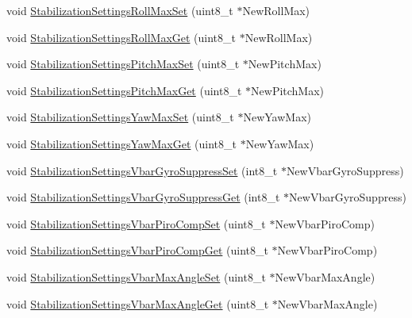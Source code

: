 \begin{DoxyCompactItemize}
void \hyperlink{group___stabilization_settings_ga93e7288b129a89ca448a48def3bf3e86}{\-Stabilization\-Settings\-Roll\-Max\-Set} (uint8\-\_\-t $\ast$\-New\-Roll\-Max)
\item 
void \hyperlink{group___stabilization_settings_ga2e25ad4927cb3f2a3e9641c54637e4f8}{\-Stabilization\-Settings\-Roll\-Max\-Get} (uint8\-\_\-t $\ast$\-New\-Roll\-Max)
\item 
void \hyperlink{group___stabilization_settings_ga8b9a76ba26621b535fa8050a8eb7d5bb}{\-Stabilization\-Settings\-Pitch\-Max\-Set} (uint8\-\_\-t $\ast$\-New\-Pitch\-Max)
\item 
void \hyperlink{group___stabilization_settings_ga0e2eb48efa28b72be85a32f6d9b1ed34}{\-Stabilization\-Settings\-Pitch\-Max\-Get} (uint8\-\_\-t $\ast$\-New\-Pitch\-Max)
\item 
void \hyperlink{group___stabilization_settings_ga6b25867e469a5776d0326baa4bc5e8c1}{\-Stabilization\-Settings\-Yaw\-Max\-Set} (uint8\-\_\-t $\ast$\-New\-Yaw\-Max)
\item 
void \hyperlink{group___stabilization_settings_gaa01ab08e37b9b9279e21a30050d5d14d}{\-Stabilization\-Settings\-Yaw\-Max\-Get} (uint8\-\_\-t $\ast$\-New\-Yaw\-Max)
\item 
void \hyperlink{group___stabilization_settings_gae984784d7f00fbed72d6575997501cad}{\-Stabilization\-Settings\-Vbar\-Gyro\-Suppress\-Set} (int8\-\_\-t $\ast$\-New\-Vbar\-Gyro\-Suppress)
\item 
void \hyperlink{group___stabilization_settings_gaad92f72a8a88d22bc37869099fd66e2f}{\-Stabilization\-Settings\-Vbar\-Gyro\-Suppress\-Get} (int8\-\_\-t $\ast$\-New\-Vbar\-Gyro\-Suppress)
\item 
void \hyperlink{group___stabilization_settings_gaf9c81d059672915abb8f80e9037e67e8}{\-Stabilization\-Settings\-Vbar\-Piro\-Comp\-Set} (uint8\-\_\-t $\ast$\-New\-Vbar\-Piro\-Comp)
\item 
void \hyperlink{group___stabilization_settings_gaafe1c6259a13878928ef70f0d2624d17}{\-Stabilization\-Settings\-Vbar\-Piro\-Comp\-Get} (uint8\-\_\-t $\ast$\-New\-Vbar\-Piro\-Comp)
\item 
void \hyperlink{group___stabilization_settings_gad32a4af319e73d264e489ea2fc8be2c6}{\-Stabilization\-Settings\-Vbar\-Max\-Angle\-Set} (uint8\-\_\-t $\ast$\-New\-Vbar\-Max\-Angle)
\item 
void \hyperlink{group___stabilization_settings_gac152cda7a0bb836fb5d2f47439beb460}{\-Stabilization\-Settings\-Vbar\-Max\-Angle\-Get} (uint8\-\_\-t $\ast$\-New\-Vbar\-Max\-Angle)
\item 

\end{DoxyCompactItemize}
